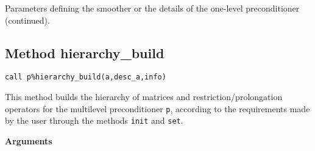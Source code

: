 \begin{center}
\begin{tabular}{|p{3cm}|l|p{2.5cm}|p{2.2cm}|p{7.1cm}|}
\hline
\end{tabular}
\end{center}
\caption{Parameters defining the smoother or the details of the one-level preconditioner
(continued).\label{tab:p_smoother_1}}  
\esideways


\clearpage

\subsection{Method hierarchy\_build\label{sec:hier_bld}}
  
\begin{center}
\verb|call p%hierarchy_build(a,desc_a,info)|\\
\end{center}

\noindent
This method builds the hierarchy of matrices and restriction/prolongation
operators for the multilevel preconditioner \verb|p|, according to the requirements
made by the user through the methods \verb|init| and \verb|set|.

{\baselineskip\noindent\large\bfseries Arguments} \smallskip

